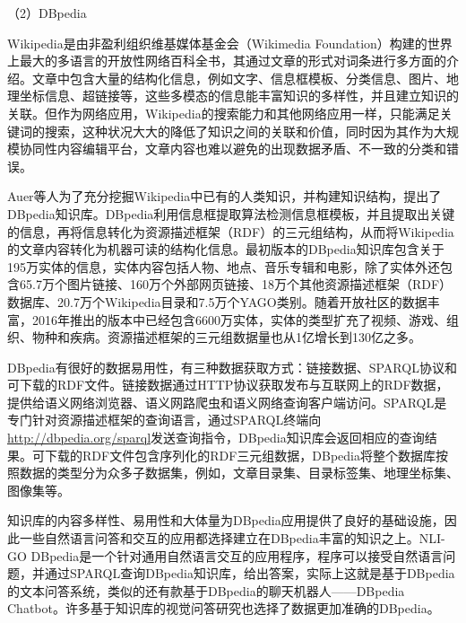 （2）DBpedia

Wikipedia是由非盈利组织维基媒体基金会（Wikimedia Foundation）构建的世界上最大的多语言的开放性网络百科全书，其通过文章的形式对词条进行多方面的介绍。文章中包含大量的结构化信息，例如文字、信息框模板、分类信息、图片、地理坐标信息、超链接等，这些多模态的信息能丰富知识的多样性，并且建立知识的关联。但作为网络应用，Wikipedia的搜索能力和其他网络应用一样，只能满足关键词的搜索，这种状况大大的降低了知识之间的关联和价值，同时因为其作为大规模协同性内容编辑平台，文章内容也难以避免的出现数据矛盾、不一致的分类和错误。

Auer等人为了充分挖掘Wikipedia中已有的人类知识，并构建知识结构，提出了DBpedia知识库。DBpedia利用信息框提取算法检测信息框模板，并且提取出关键的信息，再将信息转化为资源描述框架（RDF）的三元组结构，从而将Wikipedia的文章内容转化为机器可读的结构化信息。最初版本的DBpedia知识库包含关于195万实体的信息，实体内容包括人物、地点、音乐专辑和电影，除了实体外还包含65.7万个图片链接、160万个外部网页链接、18万个其他资源描述框架（RDF）数据库、20.7万个Wikipedia目录和7.5万个YAGO类别。随着开放社区的数据丰富，2016年推出的版本中已经包含6600万实体，实体的类型扩充了视频、游戏、组织、物种和疾病。资源描述框架的三元组数据量也从1亿增长到130亿之多。

DBpedia有很好的数据易用性，有三种数据获取方式：链接数据、SPARQL协议和可下载的RDF文件。链接数据通过HTTP协议获取发布与互联网上的RDF数据，提供给语义网络浏览器、语义网路爬虫和语义网络查询客户端访问。SPARQL是专门针对资源描述框架的查询语言，通过SPARQL终端向\url{http://dbpedia.org/sparql}发送查询指令，DBpedia知识库会返回相应的查询结果。可下载的RDF文件包含序列化的RDF三元组数据，DBpedia将整个数据库按照数据的类型分为众多子数据集，例如，文章目录集、目录标签集、地理坐标集、图像集等。

知识库的内容多样性、易用性和大体量为DBpedia应用提供了良好的基础设施，因此一些自然语言问答和交互的应用都选择建立在DBpedia丰富的知识之上。NLI-GO DBpedia是一个针对通用自然语言交互的应用程序，程序可以接受自然语言问题，并通过SPARQL查询DBpedia知识库，给出答案，实际上这就是基于DBpedia的文本问答系统，类似的还有款基于DBpedia的聊天机器人——DBpedia Chatbot。许多基于知识库的视觉问答研究也选择了数据更加准确的DBpedia。

